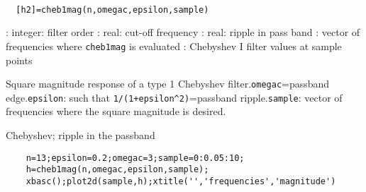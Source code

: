 
\begin{mandesc}
   \\ %
\end{mandesc}
\begin{calling_sequence}
\begin{verbatim}
  [h2]=cheb1mag(n,omegac,epsilon,sample)  
\end{verbatim}
\end{calling_sequence}
\begin{parameters}
  \begin{varlist}
    : integer: filter order
    : real: cut-off frequency
    : real: ripple in pass band
    : vector of frequencies where \verb!cheb1mag! is evaluated
    : Chebyshev I filter values at sample points
  \end{varlist}
\end{parameters}
\begin{mandescription}
  Square magnitude response of a type 1 Chebyshev filter.\verb!omegac!=passband edge.\verb!epsilon!: such that \verb!1/(1+epsilon^2)!=passband ripple.\verb!sample!: vector of frequencies where the square magnitude
  is desired.
\end{mandescription}
\begin{examples}
  Chebyshev; ripple in the passband
  \begin{Verbatim}
    n=13;epsilon=0.2;omegac=3;sample=0:0.05:10;
    h=cheb1mag(n,omegac,epsilon,sample);
    xbasc();plot2d(sample,h);xtitle('','frequencies','magnitude')
  \end{Verbatim}
\end{examples}
\begin{manseealso}
\end{manseealso}
